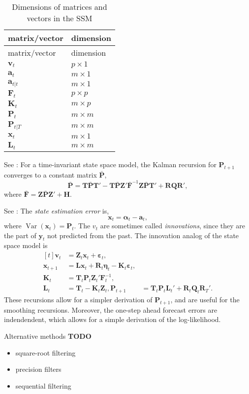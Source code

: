 \documentclass[]{book}
\providecommand{\tightlist}{%
  \setlength{\itemsep}{0pt}\setlength{\parskip}{0pt}}
\DeclareMathOperator{\Var}{Var}
\newcommand{\mat}[1]{\boldsymbol{#1}}
\renewcommand{\vec}[1]{\boldsymbol{#1}}
\renewcommand{\T}{'}
\begin{document}
\begin{longtable}[]{@{}ll@{}}
\caption{Dimensions of matrices and vectors in the SSM}\tabularnewline
\toprule
matrix/vector & dimension\tabularnewline
\midrule
\endfirsthead
\toprule
matrix/vector & dimension\tabularnewline
\midrule
\endhead
\(\vec{v}_t\) & \(p \times 1\)\tabularnewline
\(\vec{a}_t\) & \(m \times 1\)\tabularnewline
\(\vec{a}_{t|t}\) & \(m \times 1\)\tabularnewline
\(\mat{F}_t\) & \(p \times p\)\tabularnewline
\(\mat{K}_t\) & \(m \times p\)\tabularnewline
\(\mat{P}_t\) & \(m \times m\)\tabularnewline
\(\mat{P}_{t|T}\) & \(m \times m\)\tabularnewline
\(\vec{x}_t\) & \(m \times 1\)\tabularnewline
\(\mat{L}_t\) & \(m \times m\)\tabularnewline
\bottomrule
\end{longtable}

See \autocite[Sec 4.3.4]{DurbinKoopman2012}: For a time-invariant state
space model, the Kalman recursion for \(\mat{P}_{t + 1}\) converges to a
constant matrix \(\bar{\mat{P}}\), \[
\bar{\mat{P}} = \mat{T} \bar{\mat{P}} \mat{T}\T - \mat{T} \bar{\mat{P}} \mat{Z}\T \bar{\mat{F}}^{-1} \mat{Z} \bar{\mat{P}} \mat{T}\T + \mat{R} \mat{Q} \mat{R}\T ,
\] where \(\bar{\mat{F}} = \mat{Z} \bar{\mat{P}} \mat{Z}\T + \mat{H}\).

See \autocite[Sec 4.3.5]{DurbinKoopman2012}: The \emph{state estimation
error} is, \[
\vec{x}_t = \vec{\alpha}_t - \vec{a}_t,
\] where \(\Var(\vec{x}_t) = \mat{P}_t\). The \(v_t\) are sometimes
called \emph{innovations}, since they are the part of \(\vec{y}_t\) not
predicted from the past. The innovation analog of the state space model
is \[
\begin{aligned}[t]
\vec{v}_t &= \mat{Z}_t \vec{x}_t + \vec{\varepsilon}_t ,  \\
\vec{x}_{t + 1} &= \mat{L} \vec{x}_{t} + \mat{R}_t \vec{\eta}_t - \mat{K}_t \vec{\varepsilon}_t , \\
\mat{K}_t &= \mat{T}_t \mat{P}_t \mat{Z}_t\T \mat{F}_t^{-1} , \\
\mat{L}_t &= \mat{T}_t - \mat{K}_t \mat{Z}_t ,
\mat{P}_{t + 1} &= \mat{T}_t \mat{P}_t \mat{L}_t\T +  \mat{R}_t \mat{Q}_t \mat{R}_T\T  .
\end{aligned}
\] These recursions allow for a simpler derivation of
\(\mat{P}_{t + 1}\), and are useful for the smoothing recursions.
Moreover, the one-step ahead forecast errors are indendendent, which
allows for a simple derivation of the log-likelihood.

Alternative methods \textbf{TODO}

\begin{itemize}
\tightlist
\item
  square-root filtering
\item
  precision filters
\item
  sequential filtering
\end{itemize}
\end{document}
